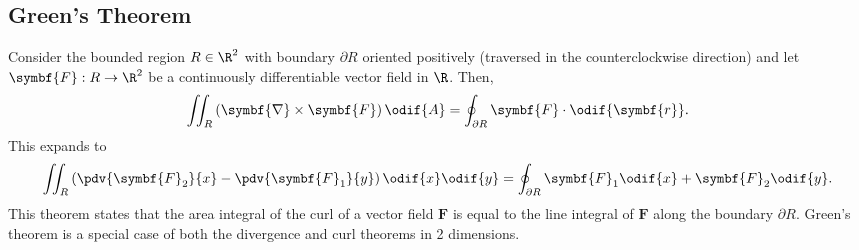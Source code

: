\documentclass{article}
\begin{document}
\subsection{Green's Theorem}
Consider the bounded region \(R \in \R^2\) with boundary \(\partial R\)
oriented positively (traversed in the counterclockwise direction) and
let \(\symbf{F}:R \to \R^2\) be a continuously differentiable vector
field in \(\R\). Then,
\begin{equation*}
    \iint_R \left( \symbf{\nabla} \times \symbf{F} \right) \odif{A} = \oint_{\partial R} \symbf{F} \cdot \odif{\symbf{r}}.
\end{equation*}
This expands to
\begin{equation*}
    \iint_R \left( \pdv{\symbf{F}_2}{x} - \pdv{\symbf{F}_1}{y} \right) \odif{x} \odif{y} = \oint_{\partial R} \symbf{F}_1 \odif{x} + \symbf{F}_2 \odif{y}.
\end{equation*}
This theorem states that the area integral of the curl of a vector field
\(\symbf{F}\) is equal to the line integral of \(\symbf{F}\) along the
boundary \(\partial R\). Green's theorem is a special case of both the
divergence and curl theorems in 2 dimensions.
\end{document}
